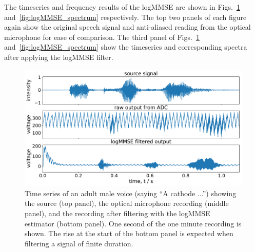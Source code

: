 \documentclass[paper-main.tex]{subfiles}
\begin{document}

The timeseries and frequency results of the logMMSE are shown in Figs.~\ref{fig:logMMSE_timeseries} and~\ref{fig:logMMSE_spectrum} respectively. 
The top two panels of each figure again show the original speech signal and anti-aliased reading from the optical microphone for ease of comparison. 
The third panel of Figs.~\ref{fig:logMMSE_timeseries} and~\ref{fig:logMMSE_spectrum} show the timeseries and corresponding spectra after applying the logMMSE filter. 
 

\begin{figure}
	\includegraphics[width=\textwidth]{figures/combined_timeseries_melatos.pdf}
	\caption{Time series of an adult male voice (saying ``A cathode ...'') showing the source (top panel), the optical microphone recording (middle panel), and the recording after filtering with the logMMSE estimator (bottom panel). One second of the one minute recording is shown. The rise at the start of the bottom panel is expected when filtering a signal of finite duration.}
	\label{fig:logMMSE_timeseries}
\end{figure}
\end{document}

